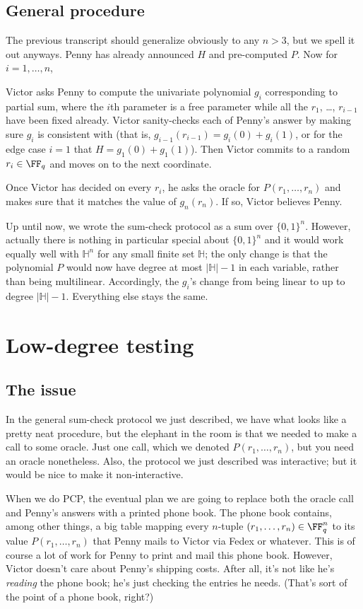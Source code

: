 \documentclass[11pt]{scrreprt}
\newcommand{\HH}{\mathbb H}
\begin{document}
\subsection{General procedure}
The previous transcript should generalize obviously to any $n > 3$,
but we spell it out anyways.
Penny has already announced $H$ and pre-computed $P$.
Now for $i = 1, \dots, n$,
\begin{itemize}
\ii Victor asks Penny to compute the univariate polynomial $g_i$
corresponding to partial sum, where the $i$th parameter is a free parameter
while all the $r_1$, \dots, $r_{i-1}$ have been fixed already.
\ii Victor sanity-checks each of Penny's answer by making sure $g_i$ is consistent
with (that is, $g_{i-1}(r_{i-1}) = g_i(0) + g_i(1)$,
or for the edge case $i=1$ that $H = g_1(0) + g_1(1)$).
\ii Then Victor commits to a random $r_i \in \FF_q$ and moves on to the next coordinate.
\end{itemize}
Once Victor has decided on every $r_i$, he asks the oracle for $P(r_1, \dots, r_n)$
and makes sure that it matches the value of $g_n(r_n)$.
If so, Victor believes Penny.

Up until now, we wrote the sum-check protocol as a sum over $\{0,1\}^n$.
However, actually there is nothing in particular special about $\{0,1\}^n$
and it would work equally well with $\HH^n$ for any small finite set $\HH$;
the only change is that the polynomial $P$
would now have degree at most $|\HH|-1$ in each variable,
rather than being multilinear.
Accordingly, the $g_i$'s change from being linear to up to degree $|\HH|-1$.
Everything else stays the same.

\section{Low-degree testing}
\subsection{The issue}
In the general sum-check protocol we just described,
we have what looks like a pretty neat procedure,
but the elephant in the room is that we needed to make a call to some oracle.
Just one call, which we denoted $P(r_1, \dots, r_n)$, but you need an oracle nonetheless.
Also, the protocol we just described was interactive;
but it would be nice to make it non-interactive.

When we do PCP, the eventual plan
we are going to replace both the oracle call and Penny's answers
with a printed phone book.
The phone book contains, among other things, a big table mapping every $n$-tuple
$(r_1, \dots, r_n) \in \FF_q^n$ to its value $P(r_1, \dots, r_n)$
that Penny mails to Victor via Fedex or whatever.
This is of course a lot of work for Penny to print and mail this phone book.
However, Victor doesn't care about Penny's shipping costs.
After all, it's not like he's \emph{reading} the phone book;
he's just checking the entries he needs.
(That's sort of the point of a phone book, right?)
\end{document}
